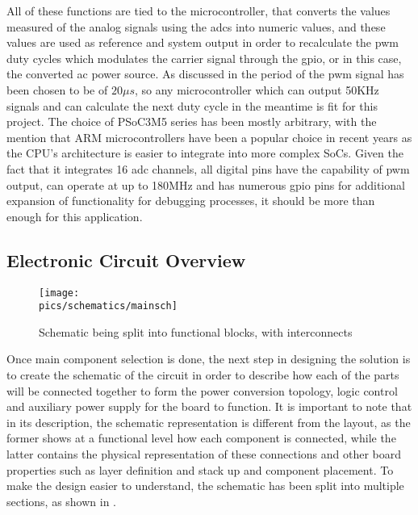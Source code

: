 All of these functions are tied to the microcontroller, that converts the values measured of the analog signals using the \gls{adc}s into numeric values, and these values are used as reference and system output in order to recalculate the \gls{pwm} duty cycles which modulates the carrier signal through the \gls{gpio}, or in this case, the converted \gls{ac} power source.
As discussed in  the period of the \gls{pwm} signal has been chosen to be of $20\mu s$, so any microcontroller which can output 50KHz signals and can calculate the next duty cycle in the meantime is fit for this project.
The choice of PSoC3M5 series has been mostly arbitrary, with the mention that ARM microcontrollers have been a popular choice in recent years as the CPU's architecture is easier to integrate into more complex SoCs.
Given the fact that it integrates 16 \gls{adc} channels, all digital pins have the capability of \gls{pwm} output, can operate at up to 180MHz and has numerous \gls{gpio} pins for additional expansion of functionality for debugging processes, it should be more than enough for this application.

\subsection{Electronic Circuit Overview}
\label{subsec:cirtdesc}

\begin{figure}[ht]
    \begin{center}\texttt{[image: \\pics/schematics/mainsch]}\end{center}
    \caption{Schematic being split into functional blocks, with interconnects}
    \label{fig:mainsch}
\end{figure}

Once main component selection is done, the next step in designing the solution is to create the schematic of the circuit in order to describe how each of the parts will be connected together to form the power conversion topology, logic control and auxiliary power supply for the board to function.
It is important to note that in its description, the schematic representation is different from the layout, as the former shows at a functional level how each component is connected, while the latter contains the physical representation of these connections and other board properties such as layer definition and stack up and component placement.
To make the design easier to understand, the schematic has been split into multiple sections, as shown in .

